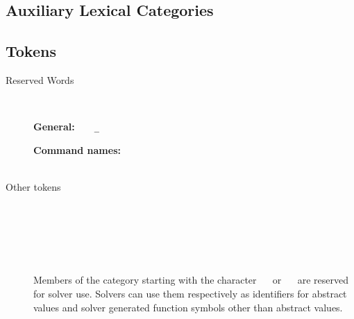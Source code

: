 {\begin{minipage}{.95\linewidth}
\end{minipage}

\subsection*{Auxiliary Lexical Categories}

\aLexical

\newpage
\subsection*{Tokens}

\begin{description}

\item[Reserved Words]
\ 
\medskip

\begin{minipage}{.95\linewidth}
\textbf{General:} \ 
\ter{!} \ 
\verb|_| \ 
 \ 
 \ 
 \ 
 \ 
 \ 
 \ 
 \ 
 \ 
 \ 
 \ 
 \ 
\medskip


\textbf{Command names:}
\ter{assert} \ 
 \ 
 \ 
 \ 
 \ 
 \ 
 \ 
 \ 
 \ 
 \ 
 \ 
 \ 
 \ 
 \ 
 \ 
 \ 
 \ 
 \ 
 \ 
 \ 
 \ 
 \ 
 \ 
 \ 
 \ 
 \ 
 \ 
 \ 
 \ 
 \ 
\end{minipage}
\medskip


\item[Other tokens]
\ 
\medskip

\ \ter{(} 

\ \ter{)}

\tokens
\medskip

\noindent
Members of the  category starting with the character
\ \ter{@} \ or \ \ter{.} \  are reserved for solver use.
Solvers can use them respectively as identifiers for abstract values and
solver generated function symbols other than abstract values.
\end{description}


}
